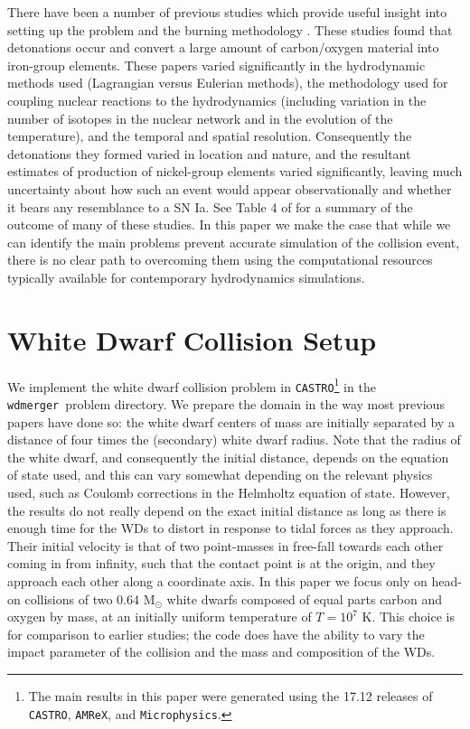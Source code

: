 \documentclass[twocolumn,numberedappendix]{../aastex6}
\newcommand{\msolar}{\mathrm{M}_\odot}
\newcommand{\amrex}{\texttt{AMReX}}
\newcommand{\castro}{\texttt{CASTRO}}
\newcommand{\microphysics}{\texttt{Microphysics}}
\newcommand{\wdmerger}{\texttt{wdmerger}}
\begin{document}
There have been a number of previous studies which provide useful insight into setting up
the problem and the burning methodology \citep{rosswog:2009,raskin:2010,loren-aguilar:2010,
hawley:2012,garcia-senz:2013,kushnir:2013,papish:2015,holcomb:2015}. These studies
found that detonations occur and convert a large amount of carbon/oxygen material into
iron-group elements. These papers varied significantly in the hydrodynamic methods used
(Lagrangian versus Eulerian methods), the methodology used for coupling nuclear
reactions to the hydrodynamics (including variation in the number of isotopes in
the nuclear network and in the evolution of the temperature), and the temporal and
spatial resolution. Consequently the detonations they formed varied in location and nature,
and the resultant estimates of production of nickel-group elements varied significantly,
leaving much uncertainty about how such an event would appear observationally and whether
it bears any resemblance to a SN Ia. See Table 4 of \cite{garcia-senz:2013} for a summary
of the outcome of many of these studies. In this paper we make the case that
while we can identify the main problems prevent accurate simulation of the collision
event, there is no clear path to overcoming them using the computational resources
typically available for contemporary hydrodynamics simulations.



\section{White Dwarf Collision Setup}
\label{sec:collisions}

We implement the white dwarf collision problem in \castro\footnote{The main results
in this paper were generated using the 17.12 releases of \castro, \amrex, and
\microphysics.} in the \wdmerger\ problem
directory. We prepare the domain in the way most previous papers have done so:
the white dwarf centers of mass are initially separated by a distance of four times
the (secondary) white dwarf radius. Note that the radius of the white dwarf, and
consequently the initial distance, depends on the equation of state used, and this
can vary somewhat depending on the relevant physics used, such as Coulomb corrections
in the Helmholtz equation of state. However, the results do not really depend on the
exact initial distance as long as there is enough time for the WDs to distort in
response to tidal forces as they approach. Their initial velocity is that of
two point-masses in free-fall towards each other coming in from infinity, such that
the contact point is at the origin, and they approach each other along a coordinate axis.
In this paper we focus only on head-on collisions of two 0.64 $\msolar$ white dwarfs
composed of equal parts carbon and oxygen by mass, at an initially uniform temperature
of $T = 10^7$ K. This choice is for comparison to earlier studies; the code does have
the ability to vary the impact parameter of the collision and the mass and composition
of the WDs.
\end{document}
